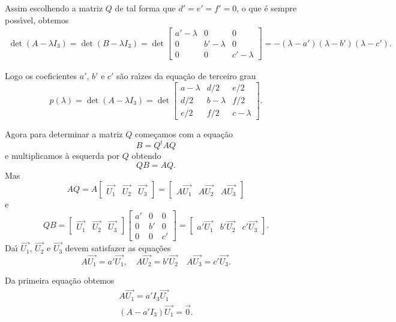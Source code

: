Assim escolhendo a matriz $Q$ de tal forma que $d' = e' = f' = 0$, o que \'e sempre poss{\'\i}vel, obtemos
\begin{align*}
  \det(A - \lambda I_3) = \det(B - \lambda I_3) = \det \begin{bmatrix}
    a' - \lambda & 0 & 0\\
    0 & b' - \lambda & 0\\
    0 & 0 & c' - \lambda
  \end{bmatrix} = -(\lambda - a')(\lambda - b')(\lambda - c').
\end{align*}

Logo os coeficientes $a'$, $b'$ e $c'$ s\~ao ra{\'\i}zes da equa\c{c}\~ao de terceiro grau
\begin{equation}
  p(\lambda) = \det(A - \lambda I_3) = \det \begin{bmatrix}
    a - \lambda & d/2 & e/2\\
    d/2 & b - \lambda & f/2\\
    e/2 & f/2 & c - \lambda
  \end{bmatrix}.
\end{equation}

Agora para determinar a matriz $Q$ come\c{c}amos com a equa\c{c}\~ao
\[
  B = Q^t A Q
\]
e multiplicamos \`a esquerda por $Q$ obtendo
\[
  Q B = AQ.
\]
Mas
\[
	AQ = A \begin{bmatrix}
		\vec{U_1} & \vec{U_2} & \vec{U_3}
	\end{bmatrix} = \begin{bmatrix}
		A\vec{U_1} & A\vec{U_2} & A\vec{U_3}
	\end{bmatrix}
\]
e
\[
	QB = \begin{bmatrix}
		\vec{U_1} & \vec{U_2} & \vec{U_3}
	\end{bmatrix}\begin{bmatrix}
		a' & 0 & 0\\
		0 & b' & 0\\
		0 & 0 & c'
	\end{bmatrix} = \begin{bmatrix}
		a'\vec{U_1} & b'\vec{U_2} & c'\vec{U_3}
	\end{bmatrix}.
\]
Da{\'\i} $\vec{U_1}$, $\vec{U_2}$ e $\vec{U_3}$ devem satisfazer as equa\c{c}\~oes
\[
	A\vec{U_1} = a'\vec{U_1},\quad A\vec{U_2} = b'\vec{U_2} \quad A\vec{U_3} = c'\vec{U_3}.
\]

Da primeira equa\c{c}\~ao obtemos
\begin{align*}
	A\vec{U_1} = a'I_3\vec{U_1}\\
	(A - a'I_3)\vec{U_1} = \vec{0}.
\end{align*}

